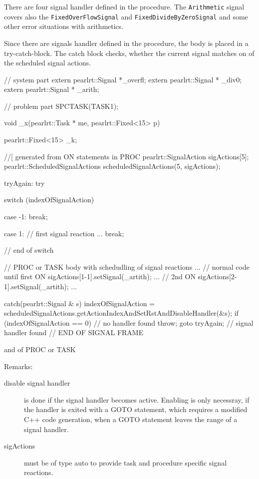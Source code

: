 There are four signal handler defined in the procedure.
The \verb|Arithmetic| signal covers also the \verb|FixedOverFlowSignal|
and \verb|FixedDivideByZeroSignal| and some other error situations 
with arithmetics.

Since there are signals handler defined in the procedure,
the body is placed in a try-catch-block.
The catch block checks, whether the current signal matches 
on of the scheduled signal actions.

\begin{CppCode}
// system part
extern pearlrt::Signal *_overfl;
extern pearlrt::Signal * _div0;
extern pearlrt::Signal * _arith;

// problem part
SPCTASK(TASK1);

void _x(pearlrt::Task * me, pearlrt::Fixed<15> p) {
   pearlrt::Fixed<15> _k;

   //[ generated from ON statements in PROC
   pearlrt::SignalAction sigActions[5];
   pearlrt::ScheduledSignalActions scheduledSignalActions(5, sigActions);

    tryAgain:
    try {
       switch (indexOfSignalAction) {
          case -1: break;

       case 1: // first signal reaction
         ...
         break;

       } // end of switch
 
       // PROC or TASK body with schedudling of signal reactions
       ...  // normal code until first ON
      sigActions[1-1].setSignal(_artith);
      ...
      // 2nd ON
      sigActions[2-1].setSignal(_artith);
      ...
   } catch(pearlrt::Signal & s) {
       indexOfSignalAction = 
		scheduledSignalActions.getActionIndexAndSetRstAndDisableHandler(&s);
       if (indexOfSignalAction == 0) {
          // no handler found
          throw;
       }
       goto tryAgain; // signal handler found
    }
    // END OF SIGNAL FRAME
}  and of PROC or TASK
\end{CppCode}


Remarks:
\begin{description}
\item[disable signal handler] is done if the signal handler becomes
   active. Enabling is only necessray, if the handler is exited 
   with a GOTO statement, which requires a modified C++ code generation,
   when a GOTO statement leaves the range of a signal handler.
\item[sigActions] must be of type auto to provide task and procedure specific 
   signal reactions.
\end{description}


